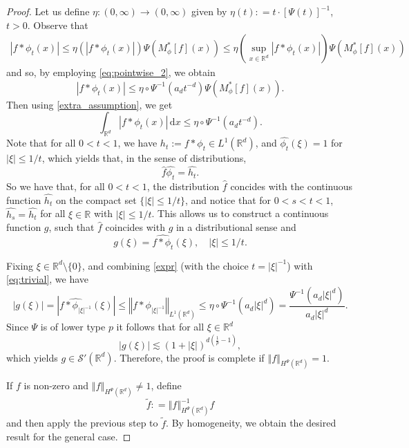 \documentclass[a4paper, leqno, 10pt]{amsart}
\numberwithin{equation}{section}
\newcommand{\dd}{\mathrm{d}}
\newcommand{\R}{\mathbb{R}}
\newcommand{\norm}[1]{\left\Vert#1\right\Vert}
\newcommand{\brkt}[1]{\left(#1\right)}
\newcommand{\abs}[1]{\left|#1\right|}
\begin{document}
\begin{proof}
Let us define $\eta : (0, \infty) \rightarrow (0, \infty)$ given by $\eta (t) : = t \cdot [\Psi (t)]^{-1}$, $t > 0$. Observe that 
\begin{align*} 
\abs{f*\phi_t(x)} \leq  \eta \brkt{ \abs{f*\phi_t(x)} } \Psi \brkt{ M_{\phi}^{\ast} [f] (x)} \leq \eta \brkt{ \sup_{x \in \R^d}{\abs{f \ast \phi_t (x)}}  } \Psi \brkt{ M_{\phi}^{\ast} [f] (x)}
\end{align*}
and so, by employing \eqref{eq:pointwise_2}, we obtain
\begin{equation}\label{eq:pointwise_ineq}
\abs{f*\phi_t(x)} \leq  \eta\circ \Psi^{-1} \brkt{a_dt^{-d}} \Psi \brkt{ M_{\phi}^{\ast} [f] (x)}.
\end{equation}
Then using \eqref{extra_assumption}, we get 
\begin{equation}\label{eq:trivial}
\int_{\R^d}  \abs{f \ast \phi_t(x)} \, \dd x \leq   \eta \circ \Psi^{-1}\brkt{a_d t^{-d} } .
\end{equation}
Note that for all $0<t<1$, we have $h_t:=f \ast \phi_t \in L^1(\R^d)$, and $\widehat{\phi_t}(\xi)=1$ for $\abs{\xi}\leq 1/t$, which yields that, in the sense of distributions, 
\[
\widehat{f}\widehat{\phi_t} = \widehat{h_t}.
\]
So we have that, for all $0<t<1$, the distribution $\widehat{f}$ concides with the continuous function $\widehat{h_t}$ on the compact set $\{ \abs{\xi}\leq 1/t \}$, and notice that for $0<s<t<1$, $\widehat{h_s}=\widehat{h_t}$ for all $\xi \in \R$ with $\abs{\xi}\leq 1/t$. This allows us to construct a continuous function $g$,   such that $\widehat{f}$ coincides with $g$ in a distributional sense and
 \begin{equation}\label{expr}
g(\xi) = \widehat{ f \ast \phi_t } (\xi), \quad \abs{\xi}\leq 1/t.
 \end{equation}

Fixing $\xi \in \R^d \setminus \{ 0 \} $, and combining  \eqref{expr} (with the choice $t = |\xi|^{-1}$) with \eqref{eq:trivial}, we have
\[ 
\abs{g (\xi)} =\abs{ \widehat{ f \ast \phi_{|\xi|^{-1}} } (\xi) } \leq  {  \norm{ f \ast \phi_{|\xi|^{-1}} }_{L^1 (\R^d)}   } \leq \eta \circ \Psi^{-1} (a_d \abs{ \xi }^d) = \frac{ \Psi^{-1} (a_d \abs{ \xi }^d) }{a_d \abs{ \xi }^d}.  
\]
Since $\Psi$ is of lower type $p$ it follows that for all $\xi\in \R^d$
\[
\abs{g (\xi)}\lesssim (1+\abs{\xi})^{d(\frac{1}{p}-1)},
\]
which yields $g\in \mathcal{S}'(\R^d)$. 
Therefore, the proof is complete if $\norm{f}_{H^{\Psi} (\R^d)} = 1$.

If $f$ is non-zero and $\norm{f}_{H^{\Psi} (\R^d)} \neq 1$, define
\[
\widetilde{f} : = \norm{f}_{H^{\Psi} (\R^d)}^{-1} f  
\]
and then apply the previous step to $\widetilde{f}$. By homogeneity, we obtain the desired result for the general case. 
\end{proof}
 
\end{document}
